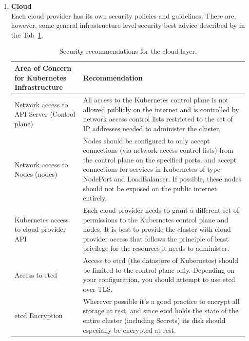 \begin{enumerate}

\item \textbf{Cloud} \\
Each cloud provider has its own security policies and guidelines. There are, however, some general infrastructure-level security best advice described by in the Tab~\ref{tab:cloud-security-recommendations}.

\begin{table}[H]
    \begin{center}
        \begin{tabular}{ | >{\raggedright\arraybackslash}p{} 
                         | >{\raggedright\arraybackslash}p{} | } 
         \hline
         \textbf{Area of Concern for Kubernetes Infrastructure} & \textbf{Recommendation} \\ 
         \hline
         Network access to API Server (Control plane) & All access to the Kubernetes control plane is not allowed publicly on the internet and is controlled by network access control lists restricted to the set of IP addresses needed to administer the cluster. \\ 
         \hline
         Network access to Nodes (nodes)  & Nodes should be configured to only accept connections (via network access control lists) from the control plane on the specified ports, and accept connections for services in Kubernetes of type NodePort and LoadBalancer. If possible, these nodes should not be exposed on the public internet entirely. \\ 
         \hline
         Kubernetes access to cloud provider API & Each cloud provider needs to grant a different set of permissions to the Kubernetes control plane and nodes. It is best to provide the cluster with cloud provider access that follows the principle of least privilege for the resources it needs to administer. \\
         \hline
         Access to etcd & Access to etcd (the datastore of Kubernetes) should be limited to the control plane only. Depending on your configuration, you should attempt to use etcd over TLS. \\
         \hline
         etcd Encryption & Wherever possible it's a good practice to encrypt all storage at rest, and since etcd holds the state of the entire cluster (including Secrets) its disk should especially be encrypted at rest. \\
         \hline
        \end{tabular}
    \end{center}
    \caption{Security recommendations for the cloud layer.}
    \label{tab:cloud-security-recommendations}
\end{table}


\end{enumerate}
